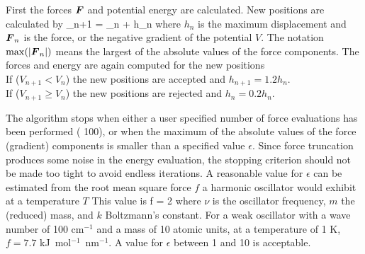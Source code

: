 First the forces $\mbox{\boldmath ${F}$}$ and potential energy are calculated.
New positions are calculated by
\beq
{}_{n+1} =  _n +  h_n
\eeq
where $h_n$ is the maximum displacement and $\mbox{\boldmath ${F}$}_n$ is the force,
or the negative gradient of the  potential $V$. The notation $\max
(|\mbox{\boldmath ${F}$}_n|)$ means the largest of the absolute values of the force
components.  The forces and energy are again computed for the new positions \\
If ($V_{n+1} < V_n$) the new positions are accepted and $h_{n+1} = 1.2
h_n$. \\
If ($V_{n+1} \geq V_n$) the new positions are rejected and $h_n = 0.2 h_n$.

The algorithm stops when either a user specified number of force 
evaluations has been performed ({\eg} 100), or when the maximum of the absolute
values of the force (gradient) components is smaller than a specified
value $\epsilon$.
Since force truncation produces some noise in the
energy evaluation, the stopping criterion should not be made too tight
to avoid endless iterations. A reasonable value for $\epsilon$ can be
estimated from the root mean square force $f$ a harmonic oscillator would exhibit at a
temperature $T$ This value is 
\beq
  f = 2 \pi \nu {}
\eeq
where $\nu$ is the oscillator frequency, $m$ the (reduced) mass, and
$k$ Boltzmann's constant. For a weak oscillator with a wave number of
100 cm$^{-1}$ and a mass of 10 atomic units, at a temperature of 1 K,
$f=7.7$ kJ~mol$^{-1}$~nm$^{-1}$. A value for $\epsilon$ between 1 and
10 is acceptable.   

